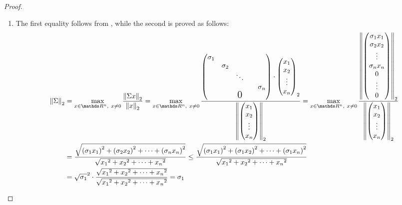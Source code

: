 \documentclass[computational_mathematics.tex]{subfiles}
\begin{document}
\begin{proof}
  \begin{enumerate}
    \item The first equality follows from , while the second is proved as follows:
  \begin{equation}
    \begin{split}
      \norm{\Sigma}_2 &=
    \max\limits_{x \in \R^n,~x \neq 0}\frac{\norm{\Sigma x}_2}{\norm{x}_2} =
    \max\limits_{x \in \R^n,~x \neq 0}\frac{\begin{pmatrix}
    \sigma_1\\
    & \sigma_2\\
    && \ddots\\
    &&&& \sigma_n\\
      &&\text{\Large 0}&&\\
    \end{pmatrix}
    \cdot 
    \begin{pmatrix}
      x_1\\
      x_2\\
      \vdots\\
      x_n\\
    \end{pmatrix}_2}
      {\norm{\begin{pmatrix}
      x_1\\
      x_2\\
      \vdots\\
      x_n\\
    \end{pmatrix}}_2}
    =
      \max\limits_{x \in \R^n,~x \neq 0}\frac{\norm{\begin{pmatrix}
      \sigma_1 x_1\\
      \sigma_2 x_2\\
      \vdots\\
      \sigma_n x_n\\
      0\\
      \vdots\\
      0\\
      \end{pmatrix}}_2}
      {\norm{\begin{pmatrix}
      x_1\\
      x_2\\
      \vdots\\
      x_n\\
      \end{pmatrix}}_2}\\
      &=
    \frac{\sqrt{{(\sigma_1 x_1)}^2 + {(\sigma_2 x_2)}^2 + \cdots +{(\sigma_n x_n)}^2}}{\sqrt{{x_1}^2 + {x_2}^2 + \cdots +{x_n}^2}}
      \le 
      \frac{\sqrt{{(\sigma_1 x_1)}^2 + {(\sigma_1 x_2)}^2 + \cdots +{(\sigma_1 x_n)}^2}}{\sqrt{{x_1}^2 + {x_2}^2 + \cdots +{x_n}^2}}\\
      &=
    \sqrt{\sigma_1}^2 \cdot \frac{\sqrt{{x_1}^2 + {x_2}^2 + \cdots +{x_n}^2}}{\sqrt{{x_1}^2 + {x_2}^2 + \cdots +{x_n}^2}}
      = \sigma_1
  \end{split}
  \end{equation}


\end{enumerate}
\end{proof}
\end{document}
